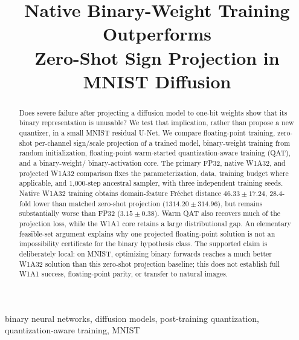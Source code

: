 \documentclass[conference]{IEEEtran}
\begin{document}
\title{Native Binary-Weight Training Outperforms\\
Zero-Shot Sign Projection in MNIST Diffusion}

\author{
\and
{}
\and
{}
}

\maketitle

\begin{abstract}
Does severe failure after projecting a diffusion model to one-bit weights show
that its binary representation is unusable? We test that implication, rather
than propose a new quantizer, in a small MNIST residual U-Net. We compare
floating-point training, zero-shot per-channel sign/scale projection of a
trained model, binary-weight training from random initialization, floating-point
warm-started quantization-aware training (QAT), and a binary-weight/
binary-activation core. The primary FP32, native W1A32, and projected W1A32
comparison fixes the parameterization, data, training budget where applicable,
and 1,000-step ancestral sampler, with three independent training seeds. Native
W1A32 training obtains domain-feature Fr\'echet distance
$46.33\mathbin{\pm}17.24$, 28.4-fold lower than matched zero-shot projection
($1314.20\mathbin{\pm}314.96$), but remains substantially worse than FP32
($3.15\mathbin{\pm}0.38$). Warm QAT also recovers much of the projection loss, while
the W1A1 core retains a large distributional gap. An elementary feasible-set
argument explains why one projected floating-point solution is not an
impossibility certificate for the binary hypothesis class. The supported claim
is deliberately local: on MNIST, optimizing binary forwards reaches a much
better W1A32 solution than this zero-shot projection baseline; this does not
establish full W1A1 success, floating-point parity, or transfer to natural images.
\end{abstract}

\begin{IEEEkeywords}
binary neural networks, diffusion models, post-training quantization,
quantization-aware training, MNIST
\end{IEEEkeywords}
\end{document}
